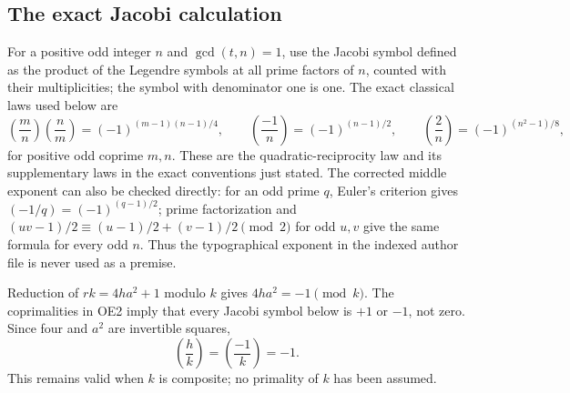 \documentclass[11pt]{article}
\begin{document}
\subsection{The exact Jacobi calculation}
For a positive odd integer $n$ and $\gcd(t,n)=1$, use the Jacobi
symbol defined as the product of the Legendre symbols at all prime
factors of $n$, counted with their multiplicities; the symbol with
denominator one is one. The exact classical laws used below are
\begin{equation}
 \left(\frac mn\right)\left(\frac nm\right)
    =(-1)^{(m-1)(n-1)/4},\qquad
 \left(\frac{-1}{n}\right)=(-1)^{(n-1)/2},\qquad
 \left(\frac2n\right)=(-1)^{(n^2-1)/8},                 \tag{OE3}
\end{equation}
for positive odd coprime $m,n$. These are the quadratic-reciprocity
law and its supplementary laws in the exact conventions just stated.
The corrected middle exponent can also be checked directly: for an
odd prime $q$, Euler's criterion gives $(-1/q)=(-1)^{(q-1)/2}$;
prime factorization and
$(uv-1)/2\equiv(u-1)/2+(v-1)/2\pmod2$ for odd $u,v$
give the same formula for every odd $n$. Thus the typographical
exponent in the indexed author file is never used as a premise.

Reduction of $rk=4ha^2+1$ modulo $k$ gives $4ha^2=-1\pmod k$.
The coprimalities in OE2 imply that every Jacobi symbol below is
$+1$ or $-1$, not zero. Since four and $a^2$ are invertible squares,
\begin{equation}
 \left(\frac hk\right)
    =\left(\frac{-1}{k}\right)=-1.                    \tag{OE4}
\end{equation}
This remains valid when $k$ is composite; no primality of $k$ has
been assumed.
\end{document}
